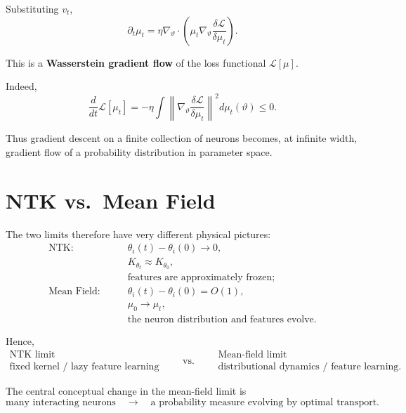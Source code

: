 Substituting \(v_t\),
\begin{equation}
    \boxed{
    \partial_t\mu_t
    =
    \eta
    \nabla_\vartheta\cdot
    \left(
        \mu_t
        \nabla_\vartheta
        \frac{\delta\mathcal{L}}
             {\delta\mu_t}
    \right).
    }
\end{equation}

This is a \textbf{Wasserstein gradient flow} of the loss functional
\(\mathcal{L}[\mu]\).

Indeed,
\begin{equation}
    \frac{d}{dt}\mathcal{L}[\mu_t]
    =
    -
    \eta
    \int
    \left\|
        \nabla_\vartheta
        \frac{\delta\mathcal{L}}
             {\delta\mu_t}
    \right\|^2
    d\mu_t(\vartheta)
    \leq 0.
\end{equation}

Thus gradient descent on a finite collection of neurons becomes,
at infinite width, gradient flow of a probability distribution in
parameter space.

\section{NTK vs.\ Mean Field}

The two limits therefore have very different physical pictures:
\begin{align}
    \text{NTK:}\qquad
    &\theta_i(t)-\theta_i(0)
    \rightarrow 0,
    \\
    &K_{\theta_t}
    \approx
    K_{\theta_0},
    \\
    &\text{features are approximately frozen};
    \\[1em]
    \text{Mean Field:}\qquad
    &\theta_i(t)-\theta_i(0)
    =
    O(1),
    \\
    &\mu_0
    \rightarrow
    \mu_t,
    \\
    &\text{the neuron distribution and features evolve}.
\end{align}

Hence,
\[
\boxed{
\begin{array}{c}
\text{NTK limit}
\\[2mm]
\text{fixed kernel / lazy feature learning}
\end{array}
\qquad\text{vs.}\qquad
\begin{array}{c}
\text{Mean-field limit}
\\[2mm]
\text{distributional dynamics / feature learning}.
\end{array}
}
\]

The central conceptual change in the mean-field limit is
\[
\boxed{
\text{many interacting neurons}
\quad\longrightarrow\quad
\text{a probability measure evolving by optimal transport}.
}
\]

